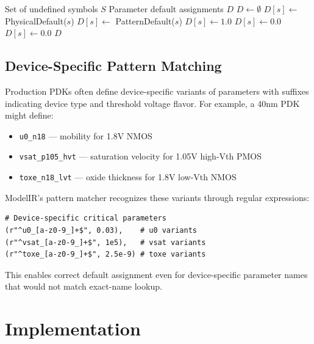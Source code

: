 \documentclass[conference]{IEEEtran}
\begin{document}
\begin{algorithm}[!t]
\caption{Intelligent Parameter Default Inference}
\label{alg:defaults}
\begin{algorithmic}[1]
\REQUIRE Set of undefined symbols $S$
\ENSURE Parameter default assignments $D$
\STATE $D \gets \emptyset$
        \STATE $D[s] \gets$ PhysicalDefault($s$)
        \STATE $D[s] \gets$ PatternDefault($s$)
        \STATE $D[s] \gets 1.0$ 
        \STATE $D[s] \gets 0.0$ 
    \ELSE
        \STATE $D[s] \gets 0.0$ 
    \ENDIF
\ENDFOR
\RETURN $D$
\end{algorithmic}
\end{algorithm}

\subsection{Device-Specific Pattern Matching}

Production PDKs often define device-specific variants of parameters with suffixes indicating device type and threshold voltage flavor. For example, a 40nm PDK might define:
\begin{itemize}
\item \texttt{u0\_n18} --- mobility for 1.8V NMOS
\item \texttt{vsat\_p105\_hvt} --- saturation velocity for 1.05V high-Vth PMOS
\item \texttt{toxe\_n18\_lvt} --- oxide thickness for 1.8V low-Vth NMOS
\end{itemize}

ModelIR's pattern matcher recognizes these variants through regular expressions:
\begin{lstlisting}[style=python]
# Device-specific critical parameters
(r"^u0_[a-z0-9_]+$", 0.03),    # u0 variants
(r"^vsat_[a-z0-9_]+$", 1e5),   # vsat variants  
(r"^toxe_[a-z0-9_]+$", 2.5e-9) # toxe variants
\end{lstlisting}

This enables correct default assignment even for device-specific parameter names that would not match exact-name lookup.

\section{Implementation}
\label{sec:implementation}
\end{document}
